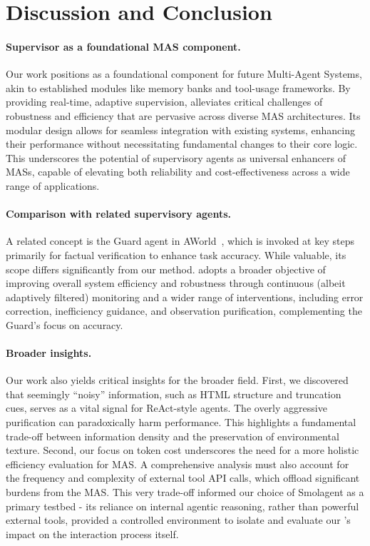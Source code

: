 \section{Discussion and Conclusion}

\paragraph{Supervisor as a foundational MAS component.}

Our work positions \method as a foundational component for future Multi-Agent Systems, akin to established modules like memory banks and tool-usage frameworks. By providing real-time, adaptive supervision, \method alleviates critical challenges of robustness and efficiency that are pervasive across diverse MAS architectures. Its modular design allows for seamless integration with existing systems, enhancing their performance without necessitating fundamental changes to their core logic. This underscores the potential of supervisory agents as universal enhancers of MASs, capable of elevating both reliability and cost-effectiveness across a wide range of applications.

\paragraph{Comparison with related supervisory agents.}
A related concept is the Guard agent in AWorld~\citep{xie2025profileawaremaneuveringdynamicmultiagent}, which is invoked at key steps primarily for factual verification to enhance task accuracy. While valuable, its scope differs significantly from our method. \method{} adopts a broader objective of improving overall system efficiency and robustness through continuous (albeit adaptively filtered) monitoring and a wider range of interventions, including error correction, inefficiency guidance, and observation purification, complementing the Guard's focus on accuracy.

\paragraph{Broader insights.}

Our work also yields critical insights for the broader field. First, we discovered that seemingly “noisy” information, such as HTML structure and truncation cues, serves as a vital signal for ReAct-style agents. The overly aggressive purification can paradoxically harm performance. This highlights a fundamental trade-off between information density and the preservation of environmental texture.
Second, our focus on token cost underscores the need for a more holistic efficiency evaluation for MAS. A comprehensive analysis must also account for the frequency and complexity of external tool API calls, which offload significant burdens from the MAS.
This very trade-off informed our choice of Smolagent as a primary testbed - its reliance on internal agentic reasoning, rather than powerful external tools, provided a controlled environment to isolate and evaluate our \method's impact on the interaction process itself.

